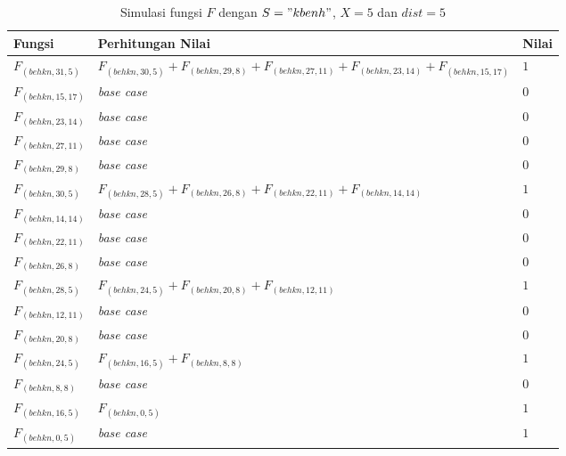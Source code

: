 \begin{table}
	\centering
	\begin{tabular} {|p{3cm}|p{5cm}|p{1cm}|} \hline
		Fungsi & Perhitungan Nilai & Nilai \\ \hline
		$ F_{(behkn, 31, 5)}  $ & $F_{(behkn, 30, 5)} + F_{(behkn, 29, 8)} + F_{(behkn, 27, 11)} + F_{(behkn, 23, 14)} + F_{(behkn, 15, 17)}$ & $ 1 $ \\ \hline
		$ F_{(behkn, 15, 17)} $ & \textit{base case} & $ 0 $ \\ \hline
		$ F_{(behkn, 23, 14)} $ & \textit{base case} & $ 0 $ \\ \hline
		$ F_{(behkn, 27, 11)} $ & \textit{base case} & $ 0 $ \\ \hline
		$ F_{(behkn, 29, 8)} $ & \textit{base case} & $ 0 $ \\ \hline
		$ F_{(behkn, 30, 5)}  $ & $F_{(behkn, 28, 5)} + F_{(behkn, 26, 8)} + F_{(behkn, 22, 11)} + F_{(behkn, 14, 14)}$ & $ 1 $ \\ \hline
		$ F_{(behkn, 14, 14)} $ & \textit{base case} & $ 0 $ \\ \hline
		$ F_{(behkn, 22, 11)} $ & \textit{base case} & $ 0 $ \\ \hline
		$ F_{(behkn, 26, 8)} $ & \textit{base case} & $ 0 $ \\ \hline
		$ F_{(behkn, 28, 5)}  $ & $F_{(behkn, 24, 5)} + F_{(behkn, 20, 8)} + F_{(behkn, 12, 11)}$ & $ 1 $ \\ \hline
		$ F_{(behkn, 12, 11)} $ & \textit{base case} & $ 0 $ \\ \hline
		$ F_{(behkn, 20, 8)} $ & \textit{base case} & $ 0 $ \\ \hline
		$ F_{(behkn, 24, 5)}  $ & $F_{(behkn, 16, 5)} + F_{(behkn, 8, 8)}$ & $ 1 $ \\ \hline
		$ F_{(behkn, 8, 8)} $ & \textit{base case} & $ 0 $ \\ \hline
		$ F_{(behkn, 16, 5)}  $ & $F_{(behkn, 0, 5)}$ & $ 1 $ \\ \hline
		$ F_{(behkn, 0, 5)} $ & \textit{base case} & $ 1 $ \\ \hline
	\end{tabular}\caption{Simulasi fungsi $ F $ dengan $ S="kbenh" $, $ X=5 $ dan $ dist= 5$}
	\label{tab:simulasi_F_1}
\end{table}

